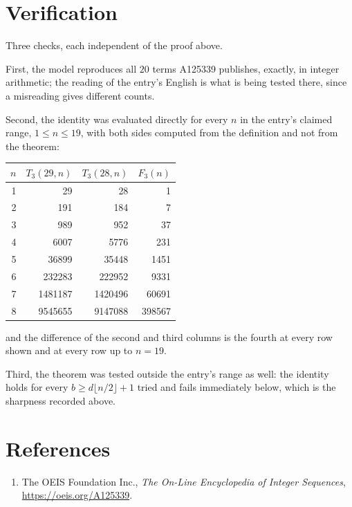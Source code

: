 \documentclass[11pt,a4paper]{article}
\theoremstyle{plain}
\theoremstyle{definition}
\begin{document}
\section{Verification}

Three checks, each independent of the proof above.

First, the model reproduces all $20$ terms A125339 publishes, exactly, in integer
arithmetic; the reading of the entry's English is what is being tested there, since a
misreading gives different counts.

Second, the identity was evaluated directly for every $n$ in the entry's claimed range,
$1\le n\le19$, with both sides computed from the definition and not from the theorem:

\begin{center}
\begin{tabular}{rrrr}
$n$ & $T_{3}(29,n)$ & $T_{3}(28,n)$ & $F_{3}(n)$ \\ \hline
1 & 29 & 28 & 1 \\
2 & 191 & 184 & 7 \\
3 & 989 & 952 & 37 \\
4 & 6007 & 5776 & 231 \\
5 & 36899 & 35448 & 1451 \\
6 & 232283 & 222952 & 9331 \\
7 & 1481187 & 1420496 & 60691 \\
8 & 9545655 & 9147088 & 398567 \\
\end{tabular}
\end{center}

\noindent and the difference of the second and third columns is the fourth at every row shown
and at every row up to $n=19$.

Third, the theorem was tested outside the entry's range as well: the identity holds for every
$b\ge d\lfloor n/2\rfloor+1$ tried and fails immediately below, which is the sharpness recorded
above.

\section*{References}
\begin{enumerate}
\item The OEIS Foundation Inc., \emph{The On-Line Encyclopedia of Integer Sequences},
\url{https://oeis.org/A125339}.
\end{enumerate}
\end{document}
